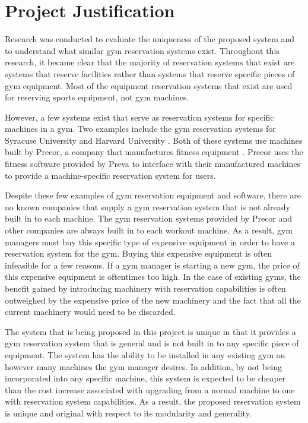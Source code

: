 \documentclass[PPFS.tex]{template/subfiles}
\begin{document}
\section{Project Justification}

Research was conducted to evaluate the uniqueness of the proposed system and to understand what similar gym reservation systems exist. Throughout this research, it became clear that the majority of reservation systems that exist are systems that reserve facilities rather than systems that reserve specific pieces of gym equipment. Most of the equipment reservation systems that exist are used for reserving sports equipment, not gym machines.

However, a few systems exist that serve as reservation systems for specific machines in a gym. Two examples include the gym reservation systems for Syracuse University \cite{Syracuse} and Harvard University \cite{Harvard}. Both of these systems use machines built by Precor, a company that manufactures fitness equipment \cite{Precor}. Precor uses the fitness software provided by Preva \cite{Preva} to interface with their manufactured machines to provide a machine-specific reservation system for users.

Despite these few examples of gym reservation equipment and software, there are no known companies that supply a gym reservation system that is not already built in to each machine. The gym reservation systems provided by Precor and other companies are always built in to each workout machine. As a result, gym managers must buy this specific type of expensive equipment in order to have a reservation system for the gym. Buying this expensive equipment is often infeasible for a few reasons. If a gym manager is starting a new gym, the price of this expensive equipment is oftentimes too high. In the case of existing gyms, the benefit gained by introducing machinery with reservation capabilities is often outweighed by the expensive price of the new machinery and the fact that all the current machinery would need to be discarded.

The system that is being proposed in this project is unique in that it provides a gym reservation system that is general and is not built in to any specific piece of equipment. The system has the ability to be installed in any existing gym on however many machines the gym manager desires. In addition, by not being incorporated into any specific machine, this system is expected to be cheaper than the cost increase associated with upgrading from a normal machine to one with reservation system capabilities. As a result, the proposed reservation system is unique and original with respect to its modularity and generality.
\end{document}
